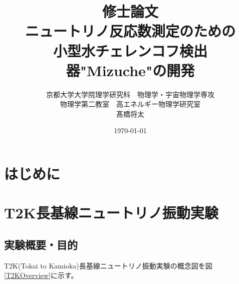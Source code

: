 \documentclass[11pt]{ltjsreport}
\newcommand{\figref}[1]{図\ref{#1}}
\begin{document}
\begin{titlepage}

\title{修士論文\\ニュートリノ反応数測定のための\\小型水チェレンコフ検出器"Mizuche"の開発}
\author{京都大学大学院理学研究科　物理学・宇宙物理学専攻\\
物理学第二教室　高エネルギー物理学研究室\\
髙橋将太
}
\date{\today}


\end{titlepage}

\maketitle

\begin{abstract}
\end{abstract}

\tableofcontents



\chapter{はじめに}
\pagestyle{bothstyle}


\chapter{T2K長基線ニュートリノ振動実験}


\section{実験概要・目的}
T2K(Tokai to Kamioka)長基線ニュートリノ振動実験の概念図を\figref{T2KOverview}に示す。
\end{document}
